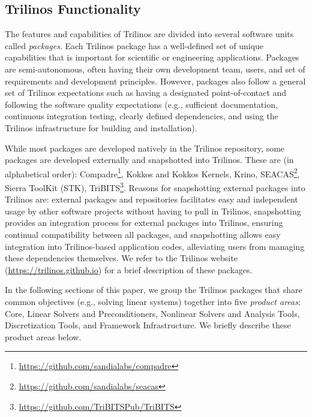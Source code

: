 \subsection{Trilinos Functionality}


The features and capabilities of Trilinos are divided into several software units called \textit{packages}.
Each Trilinos package has a well-defined set of unique capabilities that is important for scientific or engineering applications. Packages are semi-autonomous, often having their own development team, users, and set of requirements and development principles.  However, packages also follow a general set of Trilinos expectations such as having a designated point-of-contact and following the software quality expectations (e.g., sufficient documentation, continuous integration testing, clearly defined dependencies, and using the Trilinos infrastructure for building and installation).

While most packages are developed natively in the Trilinos repository, some packages are developed externally and snapshotted into Trilinos.
These are (in alphabetical order):
Compadre\footnote{\url{https://github.com/sandialabs/compadre}},
Kokkos and Kokkos Kernels,
Krino,
SEACAS\footnote{\url{https://github.com/sandialabs/seacas}},
Sierra ToolKit (STK),
TriBITS\footnote{\url{https://github.com/TriBITSPub/TriBITS}}.
Reasons for snapshotting external packages into Trilinos are:
external packages and repositories facilitates easy and independent usage by other software projects without having to pull in Trilinos,
snapshotting provides an integration process for external packages into Trilinos, ensuring continual compatibility between all packages,
and snapshotting allows easy integration into Trilinos-based application codes, alleviating users from managing these dependencies themselves.
We refer to the Trilinos website (\url{https://trilinos.github.io}) for a brief description of these packages.

In the following sections of this paper, we group the Trilinos packages that share common objectives (e.g., solving linear systems) together into five \textit{product areas}:  Core, Linear Solvers and Preconditioners, Nonlinear Solvers and Analysis Tools, Discretization Tools, and Framework Infrastructure.  We briefly describe these product areas below.

